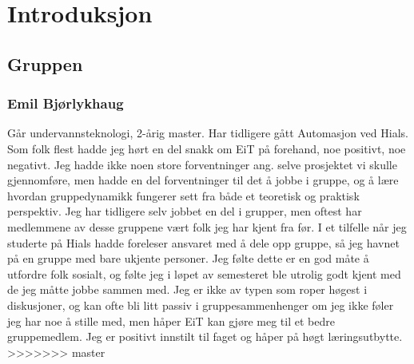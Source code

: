 \chapter{Introduksjon}
\section{Gruppen} 
\subsection{Emil Bjørlykhaug}
Går undervannsteknologi, 2-årig master. Har tidligere gått Automasjon ved Hials.
Som folk flest hadde jeg hørt en del snakk om EiT på forehand, noe positivt, noe negativt. 
Jeg hadde ikke noen store forventninger ang. selve prosjektet vi skulle gjennomføre,
 men hadde en del forventninger til det å jobbe i gruppe, og å lære hvordan gruppedynamikk 
fungerer sett fra både et teoretisk og praktisk perspektiv. Jeg har tidligere selv jobbet 
en del i grupper, men oftest har medlemmene av desse gruppene vært folk jeg har kjent 
fra før. I et tilfelle når jeg studerte på Hials hadde foreleser ansvaret med å dele opp gruppe, 
så jeg havnet på en gruppe med bare ukjente personer. Jeg følte dette er en god måte å 
utfordre folk sosialt, og følte jeg i løpet av semesteret ble utrolig godt kjent med de jeg 
måtte jobbe sammen med.
Jeg er ikke av typen som roper høgest i diskusjoner, og kan ofte bli litt passiv i 
gruppesammenhenger om jeg ikke føler jeg har noe å stille med, men håper 
EiT kan gjøre meg til et bedre gruppemedlem. Jeg er positivt innstilt til faget 
og håper på høgt læringsutbytte.
>>>>>>> master
